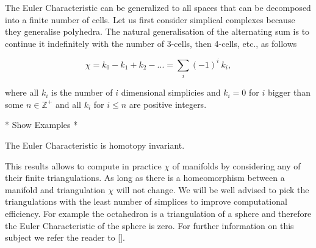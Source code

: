 The Euler Characteristic can be generalized to all spaces that can be decomposed into a finite number of cells. Let us first consider simplical complexes because they generalise polyhedra. The natural generalisation of the alternating sum is to continue it indefinitely with the number of 3-cells, then 4-cells, etc., as follows

$$ \chi = k_0 - k_1 + k_2 - ... = \sum_{i}{(-1)^i~k_i}, $$

where all $k_i$ is the number of $i$ dimensional simplicies and $k_i = 0$ for $i$ bigger than some $n \in \mathbb{Z}^+$ and all $k_i$ for $i \le n$ are positive integers. 

* Show Examples *

\begin{lem}   The Euler Characteristic is homotopy invariant. \end{lem}

This results allows to compute in practice $\chi$ of manifolds by considering any of their finite triangulations. As long as there is a homeomorphism between a manifold and triangulation $\chi$ will not change. We will be well advised to pick the triangulations with the least number of simplices to improve computational efficiency. For example the octahedron is a triangulation of a sphere and therefore the Euler Characteristic of the sphere is zero. For further information on this subject we refer the reader to [].


